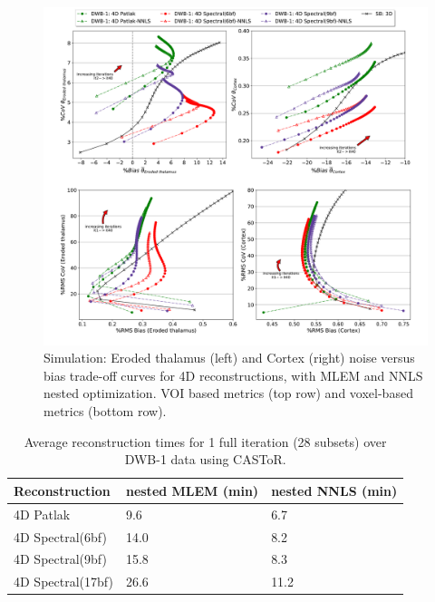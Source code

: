 \begin{figure} [ht!]
\centering
\includegraphics[scale=0.42,angle=0]{3_Results/3_2_Dynamic_Reconstruction_SimulationStudy/figures/VOI/3_3.pdf}
\caption{Simulation: Eroded thalamus (left) and Cortex (right) noise versus bias trade-off curves for 4D reconstructions, with MLEM and NNLS nested optimization. VOI based metrics (top row) and voxel-based metrics (bottom row).} 
\label{fig:3_3_DifferentNestedOptimization}
\end{figure} 

\begin{table}[ht!]
\centering
\caption{\label{tab:ReconTimes}Average reconstruction times for 1 full iteration (28 subsets) over DWB-1 data using CASToR.}
\begin{tabular}{lll}
\toprule
\textbf{Reconstruction} & \textbf{nested MLEM (min)} & \textbf{nested NNLS (min)} \\ 
\midrule
4D Patlak               & 9.6  & 6.7  \\
4D Spectral(6bf)        & 14.0 & 8.2  \\   
4D Spectral(9bf)        & 15.8 & 8.3  \\ 
4D Spectral(17bf)       & 26.6 & 11.2 \\
\toprule
\end{tabular}
\end{table}


